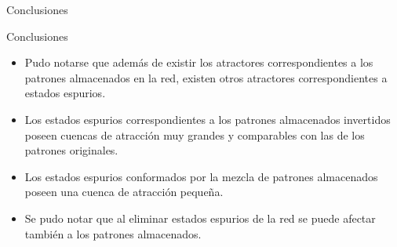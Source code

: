 \documentclass{beamer}
\begin{document}
\begin{frame}{Conclusiones}
\begin{block}{Conclusiones}
\begin{itemize}
\item Pudo notarse que además de existir los atractores correspondientes a los patrones almacenados en la red, existen otros atractores
 correspondientes a estados espurios.\\
 \item Los estados espurios correspondientes a los patrones almacenados invertidos poseen cuencas de atracción muy grandes
 y comparables con las de los patrones originales. 
 \item Los estados espurios conformados por la mezcla de patrones almacenados poseen una cuenca de atracción pequeña.\\
 \item Se pudo notar que al eliminar estados espurios de la red se puede afectar también a los patrones almacenados. 
 
\end{itemize}
\end{block}
\end{frame}
\end{document}
